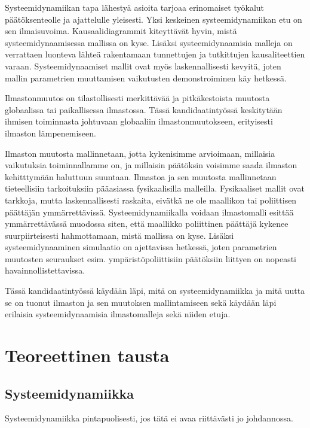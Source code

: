 \documentclass[finnish,12pt,a4paper,pdftex]{article}
\begin{document}
Systeemidynamiikan tapa lähestyä asioita tarjoaa erinomaiset työkalut päätöksenteolle ja ajattelulle yleisesti. Yksi keskeinen systeemidynamiikan etu on sen ilmaisuvoima. Kausaalidiagrammit kiteyttävät hyvin, mistä systeemidynaamisessa mallissa on kyse. Lisäksi systeemidynaamisia malleja on verrattaen luonteva lähteä rakentamaan tunnettujen ja tutkittujen kausaliteettien varaan. Systeemidynaamiset mallit ovat myös laskennallisesti kevyitä, joten mallin parametrien muuttamisen vaikutusten demonstroiminen käy hetkessä.  

Ilmastonmuutos on tilastollisesti merkittävää ja pitkäkestoista muutosta globaalissa tai paikallisessa ilmastossa. Tässä kandidaatintyössä keskitytään ihmisen toiminnasta johtuvaan globaaliin ilmastonmuutokseen, erityisesti ilmaston lämpenemiseen. 

Ilmaston muutosta mallinnetaan, jotta kykenisimme arvioimaan, millaisia vaikutuksia toiminnallamme on, ja millaisin päätöksin voisimme saada ilmaston kehitttymään haluttuun suuntaan. Ilmastoa ja sen muutosta mallinnetaan tieteellisiin tarkoituksiin pääasiassa fysikaalisilla malleilla. Fysikaaliset mallit ovat tarkkoja, mutta laskennallisesti raskaita, eivätkä ne ole maallikon tai poliittisen päättäjän ymmärrettävissä. Systeemidynamiikalla voidaan ilmastomalli esittää ymmärrettävässä muodossa siten, että maallikko poliittinen päättäjä kykenee suurpiirteisesti hahmottamaan, mistä mallissa on kyse. Lisäksi systeemidynaaminen simulaatio on ajettavissa hetkessä, joten parametrien muutosten seuraukset esim. ympäristöpoliittisiin päätöksiin liittyen on nopeasti havainnollistettavissa. 

Tässä kandidaatintyössä käydään läpi, mitä on systeemidynamiikka ja mitä uutta se on tuonut ilmaston ja sen muutoksen mallintamiseen sekä käydään läpi erilaisia systeemidynaamisia ilmastomalleja sekä niiden etuja. 




\clearpage

\section{Teoreettinen tausta}


\subsection{Systeemidynamiikka}
Systeemidynamiikka pintapuolisesti, jos tätä ei avaa riittävästi jo johdannossa. 
\end{document}

